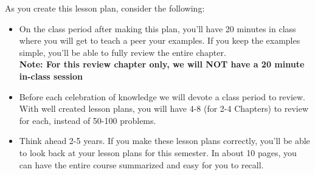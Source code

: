 As you create this lesson plan, consider the following:
\begin{itemize}
 \item On the class period after making this plan, you'll have 20 minutes in class where you will get to teach a peer your examples. If you keep the examples simple, you'll be able to fully review the entire chapter.\\
\textbf{Note: For this review chapter only, we will NOT have a 20 minute in-class session}
 \item Before each celebration of knowledge we will devote a class period to review. With well created lesson plans, you will have 4-8 (for 2-4 Chapters) to review for each, instead of 50-100 problems.
 \item Think ahead 2-5 years. If you make these lesson plans correctly, you'll be able to look back at your lesson plans for this semester. In about 10 pages, you can have the entire course summarized and easy for you to recall.
\end{itemize}


\clearpage
